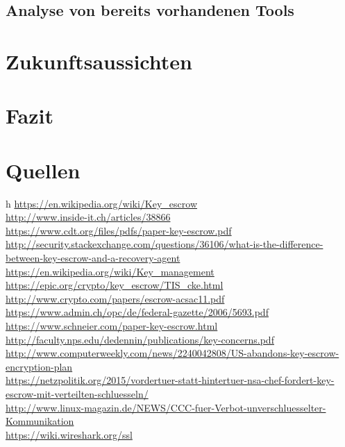 \documentclass[a4paper, 10pt, fleqn]{article}
\begin{document}
	\subsection{Analyse von bereits vorhandenen Tools} %
\clearpage
\section{Zukunftsaussichten}
\clearpage
\section{Fazit}
\clearpage
\section*{Quellen}h
\url{https://en.wikipedia.org/wiki/Key_escrow}\\
\url{http://www.inside-it.ch/articles/38866}\\
\url{https://www.cdt.org/files/pdfs/paper-key-escrow.pdf}\\
\url{http://security.stackexchange.com/questions/36106/what-is-the-difference-between-key-escrow-and-a-recovery-agent}\\
\url{https://en.wikipedia.org/wiki/Key_management}\\
\url{https://epic.org/crypto/key_escrow/TIS_cke.html}\\
\url{http://www.crypto.com/papers/escrow-acsac11.pdf}\\
\url{https://www.admin.ch/opc/de/federal-gazette/2006/5693.pdf} \\ %
\url{https://www.schneier.com/paper-key-escrow.html} \\ %
\url{http://faculty.nps.edu/dedennin/publications/key-concerns.pdf} \\ %
\url{http://www.computerweekly.com/news/2240042808/US-abandons-key-escrow-encryption-plan} \\ %
\url{https://netzpolitik.org/2015/vordertuer-statt-hintertuer-nsa-chef-fordert-key-escrow-mit-verteilten-schluesseln/} \\ %
\url{http://www.linux-magazin.de/NEWS/CCC-fuer-Verbot-unverschluesselter-Kommunikation} \\ %
\url{https://wiki.wireshark.org/ssl}
\end{document}
